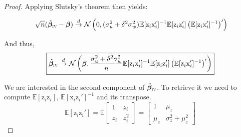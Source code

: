 \documentclass[a4paper, 11pt]{report}
\begin{document}
\begin{proof}
			Applying Slutsky's theorem then yields:
				
				\[ \sqrt{n}(\hat{\bm{\beta}}_{\textsc{iv}} - \bm{\beta}) \overset{d}{\to} 
					\mathcal{N}\left(0,  (\sigma_{u}^{2} + \delta^{2}\sigma_{w}^{2}) \mathbb{E}[\text{z}_{i}\text{x}_{i}']^{-1} \mathbb{E}[\text{z}_{i}\text{z}_{i}'] \left( \mathbb{E}[\text{z}_{i}\text{x}_{i}']^{-1}\right)' \right) \]
			
			And thus,
				~
				\begin{equation*}
					\boxed{
						\hat{\bm{\beta}}_{\textsc{iv}} \overset{d}{\to} 
							\mathcal{N}\left(\bm{\beta},  \dfrac{\sigma_{u}^{2} + \delta^{2}\sigma_{w}^{2}}{n} \mathbb{E}[\text{z}_{i}\text{x}_{i}']^{-1} \mathbb{E}[\text{z}_{i}\text{z}_{i}'] \left( \mathbb{E}[\text{z}_{i}\text{x}_{i}']^{-1}\right)' \right)
					}
				\end{equation*}
				
			We are interested in the second component of $\hat{\bm{\beta}}_{\textsc{iv}}$. To retrieve it we need to compute $\mathbb{E}[\text{z}_{i} \text{z}_{i}]$, $\mathbb{E}[\text{x}_{i}\text{z}_{i}']^{-1}$ and its transpose.  
			~
			\[ 
				\mathbb{E}[\text{z}_{i}\text{z}_i'] 
				= \mathbb{E} \begin{bmatrix}
					1 & z_{i}\\ 
					z_{i} & z_{i}^{2}
				\end{bmatrix} 
				=
				\begin{bmatrix}
					1 & \mu_{z}\\ 
					\mu_{z} & \sigma_{z}^{2} + \mu_{z}^2
				\end{bmatrix} 
				\]
			

\end{proof}
\end{document}
